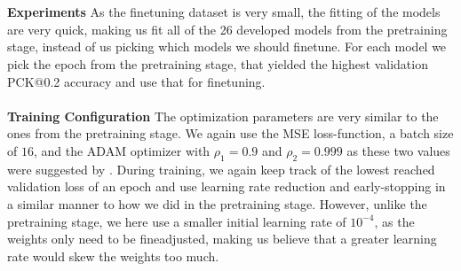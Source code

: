 \documentclass[./main.tex]{subfiles}
\begin{document}
\\
\\
\textbf{Experiments} As the finetuning dataset is very small, the fitting of the models are very quick, making us fit all of the 26 developed models from the pretraining stage, instead of us picking which models we should finetune. For each model we pick the epoch from the pretraining stage, that yielded the highest validation PCK@0.2 accuracy and use that for finetuning.
\\
\\
\textbf{Training Configuration} The optimization parameters are very similar to the ones from the pretraining stage. We again use the MSE loss-function, a batch size of $16$, and the ADAM optimizer with $\rho_1 = 0.9$ and $\rho_{2} = 0.999$ as these two values were suggested by \cite{DL_book}. During training, we again keep track of the lowest reached validation loss of an epoch and use learning rate reduction and early-stopping in a similar manner to how we did in the pretraining stage. However, unlike the pretraining stage, we here use a smaller initial learning rate of $10^{-4}$, as the weights only need to be fineadjusted, making us believe that a greater learning rate would skew the weights too much.
\end{document}
